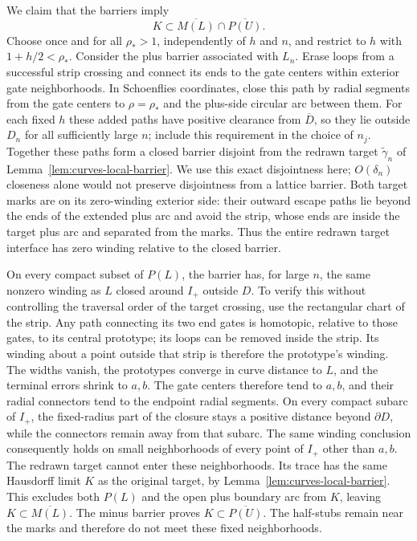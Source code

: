 We claim that the barriers imply
\begin{equation}
 K\subset\overline{M(L)}\cap\overline{P(U)}.
 \label{eq:curves-forbidden-sides}
\end{equation}
Choose once and for all $\rho_*>1$, independently of $h$ and $n$, and
restrict to $h$ with $1+h/2<\rho_*$.  Consider the plus barrier associated
with $L_n$.  Erase loops from a successful strip crossing and connect its
ends to the gate centers within exterior gate neighborhoods.  In
Schoenflies coordinates, close this path by radial segments from the gate
centers to $\rho=\rho_*$ and the plus-side circular arc between them.
For each fixed $h$ these added paths have positive clearance from
$\overline D$, so they lie outside $D_n$ for all sufficiently large $n$;
include this requirement in the choice of $n_j$.  Together these paths
form a closed barrier disjoint from the redrawn target
$\widetilde\gamma_n$ of Lemma~\ref{lem:curves-local-barrier}.  We use
this exact disjointness here; $O(\delta_n)$ closeness alone would not
preserve disjointness from a lattice barrier.  Both target marks are on
its zero-winding exterior side: their outward escape paths
lie beyond the ends of the extended plus arc and avoid the strip, whose
ends are inside the target plus arc and separated from the marks.  Thus
the entire redrawn target interface has zero winding relative to the
closed barrier.

On every compact subset of $P(L)$, the barrier has, for large $n$, the
same nonzero winding as $L$ closed around $I_+$ outside $D$.  To verify
this without controlling the traversal order of the target crossing,
use the rectangular chart of the strip.  Any path connecting its two end
gates is homotopic, relative to those gates, to its central prototype;
its loops can be removed inside the strip.  Its winding about a point
outside that strip is therefore the prototype's winding.  The widths
vanish, the prototypes converge in curve distance to $L$, and the
terminal errors shrink to $a,b$.  The gate centers therefore tend to
$a,b$, and their radial connectors tend to the endpoint radial segments.
On every compact subarc of $I_+$, the fixed-radius part of the closure
stays a positive distance beyond $\partial D$, while the connectors
remain away from that subarc.  The same winding conclusion consequently
holds on small neighborhoods of every point of $I_+$ other than $a,b$.
The redrawn target cannot enter these neighborhoods.  Its trace has
the same Hausdorff limit $K$ as the original target, by
Lemma~\ref{lem:curves-local-barrier}.  This excludes both $P(L)$ and
the open plus boundary arc from $K$, leaving
$K\subset\overline{M(L)}$.  The minus barrier proves
$K\subset\overline{P(U)}$.  The half-stubs remain near the marks and
therefore do not meet these fixed neighborhoods.


